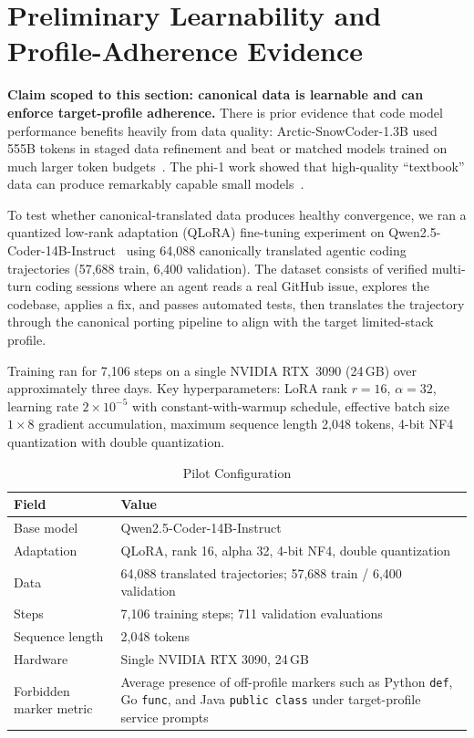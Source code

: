 \section{Preliminary Learnability and Profile-Adherence Evidence}

\textbf{Claim scoped to this section: canonical data is learnable and can enforce target-profile adherence.} There is prior evidence that code model performance benefits heavily from data quality: Arctic-SnowCoder-1.3B used 555B tokens in staged data refinement and beat or matched models trained on much larger token budgets~\cite{arcticSnowCoder}. The phi-1 work showed that high-quality ``textbook'' data can produce remarkably capable small models~\cite{phi1}.

To test whether canonical-translated data produces healthy convergence, we ran a quantized low-rank adaptation (QLoRA) fine-tuning experiment on Qwen2.5-Coder-14B-Instruct~\cite{qlora,qwenCoder} using 64,088 canonically translated agentic coding trajectories (57,688 train, 6,400 validation). The dataset consists of verified multi-turn coding sessions where an agent reads a real GitHub issue, explores the codebase, applies a fix, and passes automated tests, then translates the trajectory through the canonical porting pipeline to align with the target limited-stack profile.

Training ran for 7,106 steps on a single NVIDIA RTX~3090 (24\,GB) over approximately three days. Key hyperparameters: LoRA rank $r{=}16$, $\alpha{=}32$, learning rate $2{\times}10^{-5}$ with constant-with-warmup schedule, effective batch size $1{\times}8$ gradient accumulation, maximum sequence length 2,048 tokens, 4-bit NF4 quantization with double quantization.

\begin{table}[t]
\caption{Pilot Configuration}
\label{tab:pilotconfig}
\centering
\footnotesize
\begin{tabularx}{\columnwidth}{p{}X}
\toprule
Field & Value \\
\midrule
Base model & Qwen2.5-Coder-14B-Instruct \\
Adaptation & QLoRA, rank 16, alpha 32, 4-bit NF4, double quantization \\
Data & 64,088 translated trajectories; 57,688 train / 6,400 validation \\
Steps & 7,106 training steps; 711 validation evaluations \\
Sequence length & 2,048 tokens \\
Hardware & Single NVIDIA RTX 3090, 24\,GB \\
Forbidden marker metric & Average presence of off-profile markers such as Python \texttt{def}, Go \texttt{func}, and Java \texttt{public class} under target-profile service prompts \\
\bottomrule
\end{tabularx}
\end{table}

